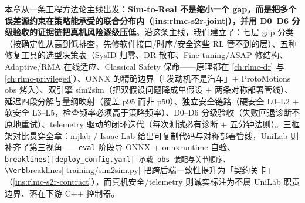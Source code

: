 本章从一条工程方法论主线出发：\textbf{Sim-to-Real 不是缩小一个 gap，而是把多个误差源约束在策略能承受的联合分布内（\cref{ins:rlmc-s2r-joint}），并用 D0--D6 分级验收的证据链把真机风险逐级压低}。沿这条主线，我们建立了：七层 gap 分类（按确定性从高到低排查，先修软件接口/时序/安全这些 RL 管不到的层）、五种修复工具的选型决策表（SysID 归零、DR 散布、Fine-tuning/ASAP 修结构、Adaptive/RMA 在线适应、Classical Safety 保命——原理都在 \cref{ch:rlmc-dr} 与 \cref{ch:rlmc-privileged}）、ONNX 的精确边界（「发动机不是汽车」$+$ ProtoMotions obs 烤入）、双引擎 sim2sim（把双假设问题降成单假设 $+$ 两条对称部署管线）、延迟四段分解与量纲映射（覆盖 p95 而非 p50）、独立安全链路（硬安全 L0--L2 $+$ 软安全 L3--L5，检查频率必须高于策略频率）、D0--D6 分级验收（失败回退诊断不原地重试）、telemetry 驱动的闭环迭代（每次测试必有诊断 $+$ 五分钟法则）。三框架对比贯穿全章：mjlab / Isaac Lab 给出可复制代码与对称部署管线，UniLab 则补齐了第三视角——\verb|eval| 阶段导 ONNX $+$ onnxruntime 自验、\Verb[breaklines]|deploy_config.yaml| 承载 obs 装配与关节顺序、\Verb[breaklines]|training/sim2sim.py| 把跨后端一致性提升为「契约关卡」（\cref{ins:rlmc-s2r-contract}），而真机安全/telemetry 则诚实标注为不属 UniLab 职责边界、落在下游 C++ 控制器。

